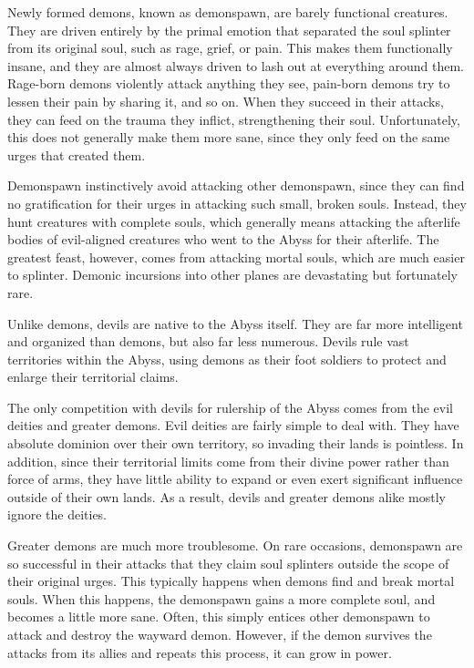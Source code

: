       Newly formed demons, known as demonspawn, are barely functional creatures.
      They are driven entirely by the primal emotion that separated the soul splinter from its original soul, such as rage, grief, or pain.
      This makes them functionally insane, and they are almost always driven to lash out at everything around them.
      Rage-born demons violently attack anything they see, pain-born demons try to lessen their pain by sharing it, and so on.
      When they succeed in their attacks, they can feed on the trauma they inflict, strengthening their soul.
      Unfortunately, this does not generally make them more sane, since they only feed on the same urges that created them.

      Demonspawn instinctively avoid attacking other demonspawn, since they can find no gratification for their urges in attacking such small, broken souls.
      Instead, they hunt creatures with complete souls, which generally means attacking the afterlife bodies of evil-aligned creatures who went to the Abyss for their afterlife.
      The greatest feast, however, comes from attacking mortal souls, which are much easier to splinter.
      Demonic incursions into other planes are devastating but fortunately rare.

      Unlike demons, devils are native to the Abyss itself.
      They are far more intelligent and organized than demons, but also far less numerous.
      Devils rule vast territories within the Abyss, using demons as their foot soldiers to protect and enlarge their territorial claims.

      The only competition with devils for rulership of the Abyss comes from the evil deities and greater demons.
      Evil deities are fairly simple to deal with.
      They have absolute dominion over their own territory, so invading their lands is pointless.
      In addition, since their territorial limits come from their divine power rather than force of arms, they have little ability to expand or even exert significant influence outside of their own lands.
      As a result, devils and greater demons alike mostly ignore the deities.

      Greater demons are much more troublesome.
      On rare occasions, demonspawn are so successful in their attacks that they claim soul splinters outside the scope of their original urges.
      This typically happens when demons find and break mortal souls.
      When this happens, the demonspawn gains a more complete soul, and becomes a little more sane.
      Often, this simply entices other demonspawn to attack and destroy the wayward demon.
      However, if the demon survives the attacks from its allies and repeats this process, it can grow in power.

